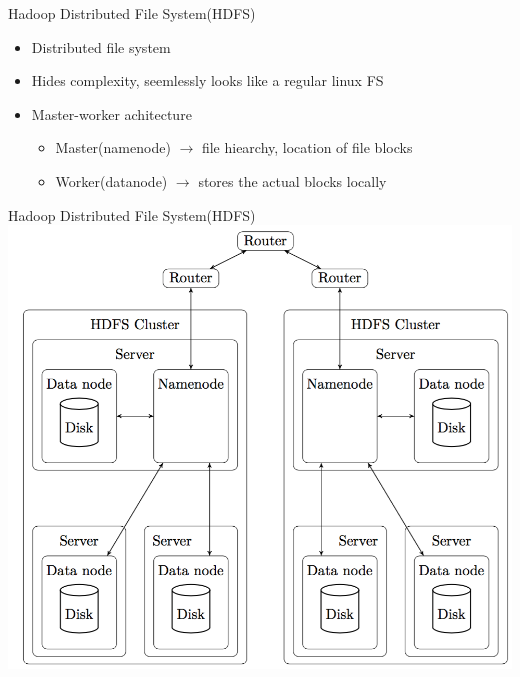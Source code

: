 \begin{frame}{Hadoop Distributed File System(HDFS)}
    \begin{itemize}
        \item Distributed file system 
        \item Hides complexity, seemlessly looks like a regular linux FS
        \item Master-worker achitecture
        \begin{itemize}
            \item Master(namenode) $\rightarrow$ file hiearchy, location of file blocks
            \item Worker(datanode) $\rightarrow$ stores the actual blocks locally
        \end{itemize}
    \end{itemize}
\end{frame}

\begin{frame}{Hadoop Distributed File System(HDFS)}
    \centering \includegraphics[scale=0.5]{bigdataandcluster/hdfs.png}
\end{frame}

